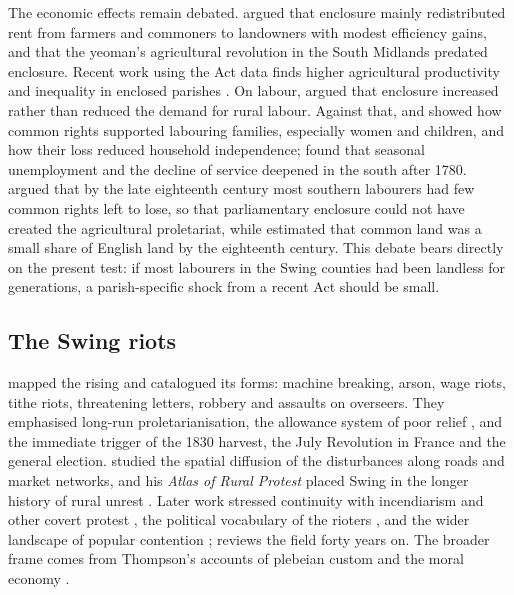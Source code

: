 \documentclass[11pt,a4paper]{article}
\begin{document}
The economic effects remain debated. \citet{allen1982} argued that enclosure mainly redistributed rent from farmers and commoners to landowners with modest efficiency gains, and \citet{allen1992} that the yeoman's agricultural revolution in the South Midlands predated enclosure. Recent work using the Act data finds higher agricultural productivity and inequality in enclosed parishes \citep{heldring2022}. On labour, \citet{chambers1953} argued that enclosure increased rather than reduced the demand for rural labour. Against that, \citet{humphries1990} and \citet{neeson1993} showed how common rights supported labouring families, especially women and children, and how their loss reduced household independence; \citet{snell1985} found that seasonal unemployment and the decline of service deepened in the south after 1780. \citet{shawtaylor2001} argued that by the late eighteenth century most southern labourers had few common rights left to lose, so that parliamentary enclosure could not have created the agricultural proletariat, while \citet{clarkclark2001} estimated that common land was a small share of English land by the eighteenth century. This debate bears directly on the present test: if most labourers in the Swing counties had been landless for generations, a parish-specific shock from a recent Act should be small.

\subsection{The Swing riots}
\citet{hobsbawmrude1969} mapped the rising and catalogued its forms: machine breaking, arson, wage riots, tithe riots, threatening letters, robbery and assaults on overseers. They emphasised long-run proletarianisation, the allowance system of poor relief \citep{boyer1990}, and the immediate trigger of the 1830 harvest, the July Revolution in France and the general election. \citet{charlesworth1979} studied the spatial diffusion of the disturbances along roads and market networks, and his \textit{Atlas of Rural Protest} placed Swing in the longer history of rural unrest \citep{charlesworth1983,charlesworth1994}. Later work stressed continuity with incendiarism and other covert protest \citep{archer1990}, the political vocabulary of the rioters \citep{griffin2012}, and the wider landscape of popular contention \citep{tilly1995,stevenson1979,dunbabin1974}; \citet{randall2009} reviews the field forty years on. The broader frame comes from Thompson's accounts of plebeian custom and the moral economy \citep{thompson1963,thompson1971}.
\end{document}

